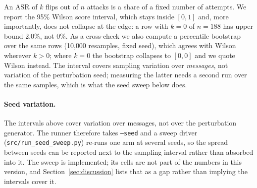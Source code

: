 An ASR of $k$ flips out of $n$ attacks is a share of a fixed number of attempts.
We report the 95\% Wilson score interval, which stays inside $[0,1]$ and, more
importantly, does not collapse at the edge: a row with $k=0$ of $n=188$ has upper
bound 2.0\%, not 0\%. As a cross-check we also compute a percentile bootstrap
over the same rows (10{,}000 resamples, fixed seed), which agrees with Wilson
wherever $k>0$; where $k=0$ the bootstrap collapses to $[0,0]$ and we quote
Wilson instead. The interval covers sampling variation over \emph{messages}, not
variation of the perturbation seed; measuring the latter needs a second run over
the same samples, which is what the seed sweep below does.

\paragraph{Seed variation.} The intervals above cover variation over messages,
not over the perturbation generator. The runner therefore takes \texttt{--seed}
and a sweep driver (\texttt{src/run\_seed\_sweep.py}) re-runs one arm at several
seeds, so the spread between seeds can be reported next to the sampling interval
rather than absorbed into it. The sweep is implemented; its cells are not part of
the numbers in this version, and Section~\ref{sec:discussion} lists that as a gap
rather than implying the intervals cover it.
